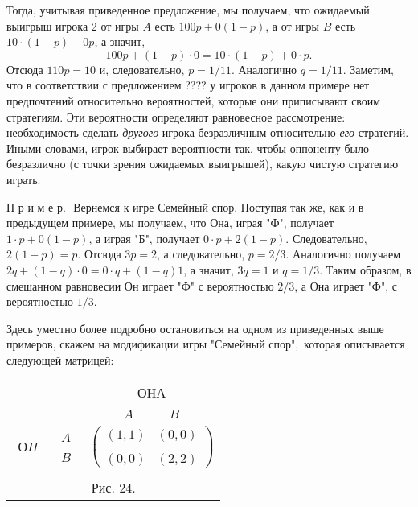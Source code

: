 {Тогда, учитывая приведенное предложение, мы получаем, что ожидаемый
выигрыш игрока 2 от игры $A$ есть $100p+0(1-p)$, а от игры $B$ есть
$10\cdot(1-p)+0p$, а значит,
$$
100p+(1-p)\cdot 0=10\cdot (1-p)+0\cdot p.
$$
Отсюда $110p=10$ и, следовательно, $p=1/11$. Аналогично $q=1/11$.
Заметим, что в соответствии с предложением ???? у игроков в данном
примере нет предпочтений относительно вероятностей, которые они
приписывают своим стратегиям. Эти вероятности определяют равновесное
рассмотрение: необходимость сделать {\it другого} игрока
безразличным относительно {\it его} стратегий. Иными словами, игрок
выбирает вероятности так, чтобы оппоненту было безразлично (с точки
зрения ожидаемых выигрышей), какую чистую стратегию играть.
\smallskip

П р и м е р.\,\, Вернемся к игре Семейный спор. Поступая так же, как и в
предыдущем примере, мы получаем, что Она,  играя "Ф", получает
$1\cdot p+0(1-p)$, а играя "Б", получает $0\cdot p+2(1-p)$.
Следовательно, $2(1-p)=p$. Отсюда $3p=2$, а следовательно, $p=2/3$.
Аналогично получаем $2q+(1-q)\cdot 0=0\cdot q+(1-q)1$, а значит,
$3q=1$ и $q=1/3$. Таким образом, в смешанном равновесии Он играет
"Ф" с вероятностью $2/3$, а Она играет "Ф",  с вероятностью $1/3$.

Здесь уместно более подробно остановиться на одном из приведенных
выше примеров, скажем на модификации игры "Семейный спор",\, которая
описывается следующей матрицей:

\begin{center}
\begin{tabular}{ccc}
&&ОHА\\
&&$\begin{array}{cc} A\quad&\quad B\end{array}$\\
$\begin{array}{c} \\ ОH\\ \end{array}$& $\begin{array}{c} A\\ \\
B\end{array}$& $\left(\begin{array}{cc}
(1,1)&(0,0)\\
\\
(0,0)&(2,2)\end{array}\right) $\\
\multicolumn{3}{c}{}\\
\multicolumn{3}{c}{Рис. 24.}\\
\end{tabular}
\end{center}

}
